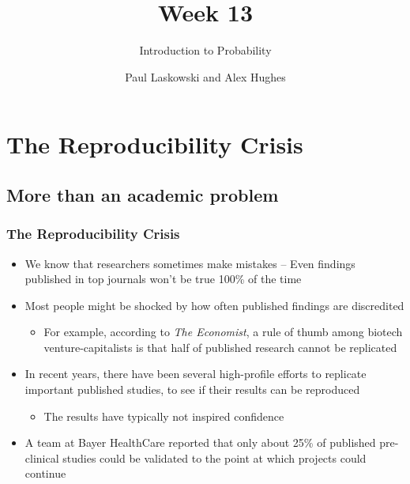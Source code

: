 \documentclass[10pt, block=fill]{beamer}
\title{Week 13}
\subtitle{Introduction to Probability}
\author{Paul Laskowski and Alex Hughes}
\institute{UC Berkeley, School of Information}
\begin{document}
\begin{frame}
\maketitle
\end{frame}

\begin{frame}
  \tableofcontents[hideallsubsections]
\end{frame}

\section{The Reproducibility Crisis}
\subsection{More than an academic problem}

\begin{frame}
  \frametitle{The Reproducibility Crisis}

  \begin{itemize}
    \item We know that researchers sometimes make mistakes -- Even findings published in top journals won't be true 100\% of the time
    \item Most people might be shocked by how often published findings are discredited
    \begin{itemize}
      \item For example, according to \textit{The Economist}, a rule of thumb among biotech venture-capitalists is that half of published research cannot be replicated
    \end{itemize}
    \item In recent years, there have been several high-profile efforts to replicate important published studies, to see if their results can be reproduced
    \begin{itemize}
      \item The results have typically not inspired confidence
    \end{itemize}
    \item A team at Bayer HealthCare reported that only about 25\% of published pre-clinical studies could be validated to the point at which projects could continue
  \end{itemize}
  
\end{frame}
\end{document}

